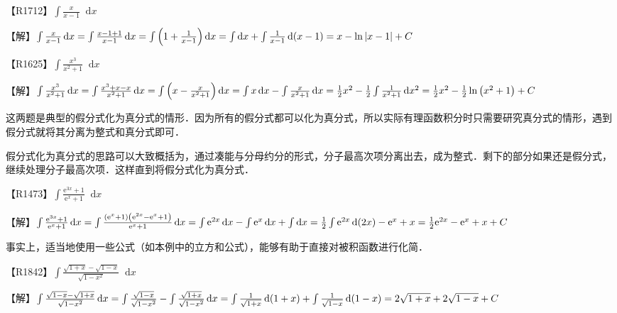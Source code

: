 \documentclass{ctexbook}
\newcommand{\e}{\mathrm{e}}
\newcommand*{\dif}{\mathop{}\!\mathrm{d}}
\begin{document}
【R1712】$\int\frac{x}{x-1}\dif{x}$\par
【解】$\int\frac{x}{x-1}\dif{x}\\=\int\frac{x-1+1}{x-1}\dif{x}\\=\int\left(1+\frac{1}{x-1}\right)\dif{x}\\=\int\dif{x}+\int\frac{1}{x-1}\dif{\left(x-1\right)}\\=x-\ln{\left|x-1\right|}+C$\par
【R1625】$\int\frac{x^{3}}{x^{2}+1}\dif{x}$\par
【解】$\int\frac{x^{3}}{x^{2}+1}\dif{x}\\=\int\frac{x^{3}+x-x}{x^{2}+1}\dif{x}\\=\int\left(x-\frac{x}{x^{2}+1}\right)\dif{x}\\=\int x\dif{x}-\int\frac{x}{x^{2}+1}\dif{x}\\=\frac{1}{2}x^{2}-\frac{1}{2}\int\frac{1}{x^{2}+1}\dif{x^{2}}\\=\frac{1}{2}x^{2}-\frac{1}{2}\ln{\left(x^{2}+1\right)}+C$\par
{\kaishu 这两题是典型的假分式化为真分式的情形．因为所有的假分式都可以化为真分式，所以实际有理函数积分时只需要研究真分式的情形，遇到假分式就将其分离为整式和真分式即可．\par
假分式化为真分式的思路可以大致概括为，通过凑能与分母约分的形式，分子最高次项分离出去，成为整式．剩下的部分如果还是假分式，继续处理分子最高次项．这样直到将假分式化为真分式．}\par
【R1473】$\int\frac{\e^{3x}+1}{\e^{x}+1}\dif{x}$\par
【解】$\int\frac{\e^{3x}+1}{\e^{x}+1}\dif{x}\\=\int\frac{\left(\e^{x}+1\right)\left(\e^{2x}-\e^{x}+1\right)}{\e^{x}+1}\dif{x}\\=\int\e^{2x}\dif{x}-\int\e^{x}\dif{x}+\int\dif{x}\\=\frac{1}{2}\int\e^{2x}\dif{\left(2x\right)}-\e^{x}+x\\=\frac{1}{2}\e^{2x}-\e^{x}+x+C$\par
{\kaishu 事实上，适当地使用一些公式（如本例中的立方和公式），能够有助于直接对被积函数进行化简．}\par
【R1842】$\int\frac{\sqrt{1+x}-\sqrt{1-x}}{\sqrt{1-x^{2}}}\dif{x}$\par
【解】$\int\frac{\sqrt{1-x}-\sqrt{1+x}}{\sqrt{1-x^{2}}}\dif{x}\\=\int\frac{\sqrt{1-x}}{\sqrt{1-x^{2}}}-\int\frac{\sqrt{1+x}}{\sqrt{1-x^{2}}}\dif{x}\\=\int\frac{1}{\sqrt{1+x}}\dif{\left(1+x\right)}+\int\frac{1}{\sqrt{1-x}}\dif{\left(1-x\right)}\\=2\sqrt{1+x}+2\sqrt{1-x}+C$\par
\end{document}

